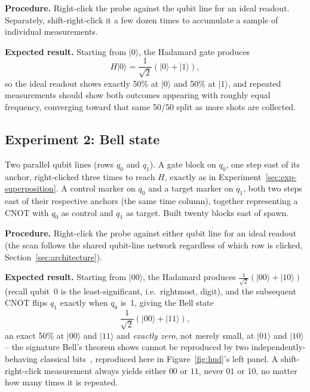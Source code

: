 \textbf{Procedure.} Right-click the probe against the qubit line for an ideal readout.
Separately, shift-right-click it a few dozen times to accumulate a sample of individual
measurements.

\textbf{Expected result.} Starting from $|0\rangle$, the Hadamard gate produces
\begin{equation}
H|0\rangle = \frac{1}{\sqrt2}\left(|0\rangle + |1\rangle\right),
\end{equation}
so the ideal readout shows exactly 50\% at $|0\rangle$ and 50\% at $|1\rangle$, and repeated
measurements should show both outcomes appearing with roughly equal frequency, converging
toward that same 50/50 split as more shots are collected.

\subsection{Experiment 2: Bell state}
\label{sec:exp-bell}

Two parallel qubit lines (rows $q_0$ and $q_1$). A gate block on $q_0$, one step east of its
anchor, right-clicked three times to reach $H$, exactly as in
Experiment~\ref{sec:exp-superposition}. A control marker on $q_0$ and a target marker on
$q_1$, both two steps east of their respective anchors (the same time column), together
representing a CNOT with $q_0$ as control and $q_1$ as target. Built twenty blocks east of
spawn.

\textbf{Procedure.} Right-click the probe against either qubit line for an ideal readout (the
scan follows the shared qubit-line network regardless of which row is clicked,
Section~\ref{sec:architecture}).

\textbf{Expected result.} Starting from $|00\rangle$, the Hadamard produces
$\frac{1}{\sqrt2}(|00\rangle + |10\rangle)$ (recall qubit~0 is the least-significant, i.e.\
rightmost, digit), and the subsequent CNOT flips $q_1$ exactly when $q_0$ is~1, giving the
Bell state
\begin{equation}
\frac{1}{\sqrt2}\left(|00\rangle + |11\rangle\right),
\end{equation}
an exact 50\% at $|00\rangle$ and $|11\rangle$ and \emph{exactly zero}, not merely small, at
$|01\rangle$ and $|10\rangle$ -- the signature Bell's theorem shows cannot be reproduced by
two independently-behaving classical bits~\cite{bell1964epr}, reproduced here in Figure~\ref{fig:hud}'s
left panel. A shift-right-click measurement always yields either $00$ or $11$, never $01$ or
$10$, no matter how many times it is repeated.

